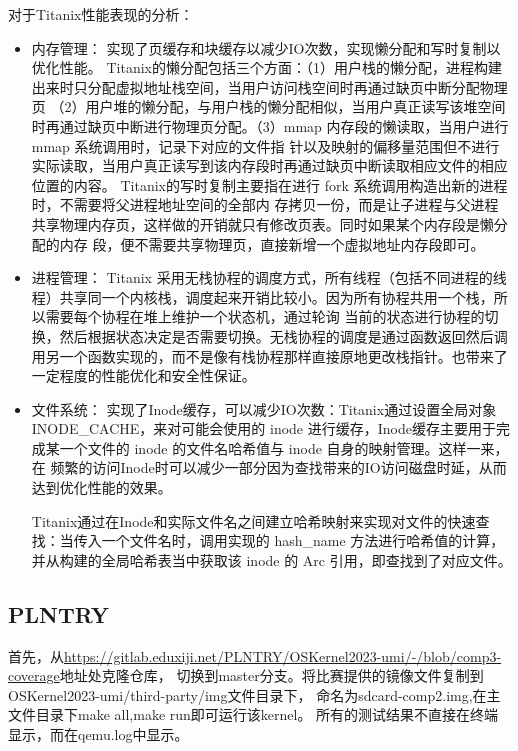 对于Titanix性能表现的分析：
\begin{itemize}
    \item 内存管理：
    实现了页缓存和块缓存以减少IO次数，实现懒分配和写时复制以优化性能。
    Titanix的懒分配包括三个方面：（1）用户栈的懒分配，进程构建出来时只分配虚拟地址栈空间，当用户访问栈空间时再通过缺页中断分配物理页
    （2）用户堆的懒分配，与用户栈的懒分配相似，当用户真正读写该堆空间时再通过缺页中断进行物理页分配。（3）mmap 内存段的懒读取，当用户进行 mmap 系统调用时，记录下对应的文件指
    针以及映射的偏移量范围但不进行实际读取，当用户真正读写到该内存段时再通过缺页中断读取相应文件的相应位置的内容。
    Titanix的写时复制主要指在进行 fork 系统调用构造出新的进程时，不需要将父进程地址空间的全部内
    存拷贝一份，而是让子进程与父进程共享物理内存页，这样做的开销就只有修改页表。同时如果某个内存段是懒分配的内存
    段，便不需要共享物理页，直接新增一个虚拟地址内存段即可。
    \item 进程管理：
    Titanix 采用无栈协程的调度方式，所有线程（包括不同进程的线程）共享同一个内核栈，调度起来开销比较小。因为所有协程共用一个栈，所以需要每个协程在堆上维护一个状态机，通过轮询
    当前的状态进行协程的切换，然后根据状态决定是否需要切换。无栈协程的调度是通过函数返回然后调用另一个函数实现的，而不是像有栈协程那样直接原地更改栈指针。也带来了一定程度的性能优化和安全性保证。
    \item 文件系统：
    实现了Inode缓存，可以减少IO次数：Titanix通过设置全局对象 INODE_CACHE，来对可能会使用的 inode 进行缓存，Inode缓存主要用于完成某一个文件的 inode 的文件名哈希值与 inode 自身的映射管理。这样一来，在
    频繁的访问Inode时可以减少一部分因为查找带来的IO访问磁盘时延，从而达到优化性能的效果。
    
    Titanix通过在Inode和实际文件名之间建立哈希映射来实现对文件的快速查找：当传入一个文件名时，调用实现的 hash_name 方法进行哈希值的计算，并从构建的全局哈希表当中获取该 inode 的
    Arc 引用，即查找到了对应文件。


\end{itemize}

\subsection{PLNTRY}

首先，从\href{https://gitlab.eduxiji.net/PLNTRY/OSKernel2023-umi/-/blob/comp3-coverage}{https://gitlab.eduxiji.net/PLNTRY/OSKernel2023-umi/-/blob/comp3-coverage}地址处克隆仓库，
切换到master分支。将比赛提供的镜像文件复制到OSKernel2023-umi/third-party/img文件目录下，
命名为sdcard-comp2.img,在主文件目录下make all,make run即可运行该kernel。
所有的测试结果不直接在终端显示，而在qemu.log中显示。




